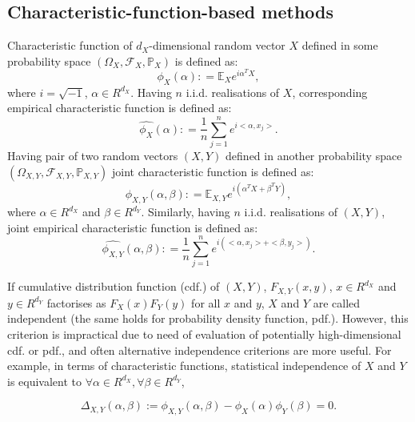 \documentclass{article}
\begin{document}
\subsection{Characteristic-function-based methods}
\label{section:previous_work_cf}
Characteristic function of $d_{X}$-dimensional random vector $X$ defined in some probability space $(\Omega_{X}, \mathcal{F}_{X}, \mathbb{P}_{X})$ is defined as: 
\begin{equation}
    \label{eq:characteristic_function}
    \phi_{X}(\alpha): = \mathbb{E}_{X} e^{i\alpha^{T}X}, 
\end{equation}
where $i=\sqrt{-1}$, $\alpha \in R^{d_{X}}$. Having $n$ i.i.d. realisations of $X$, corresponding empirical characteristic function is defined as:
\begin{equation}
    \label{eq:ecf}
  \widehat{\phi_{X}}(\alpha): = \frac{1}{n} \sum_{j=1}^{n} e^{i <\alpha, x_{j}>}.
\end{equation}
Having pair of two random vectors $(X,Y)$ defined in another probability space $(\Omega_{X,Y}, \mathcal{F}_{X,Y}, \mathbb{P}_{X,Y})$  joint characteristic function is defined as:
\begin{equation}
    \label{eq:joint_characteristic_function}
    \phi_{X,Y}(\alpha,\beta): = \mathbb{E}_{X,Y} e^{i(\alpha^{T}X + \beta^{T}Y)},
\end{equation}
where $\alpha \in R^{d_{X}}$ and $\beta \in R^{d_{Y}}$. Similarly, having 
$n$ i.i.d. realisations of $(X,Y)$, joint empirical characteristic function is defined as:
\begin{equation}
    \label{eq:joint_ecf}
\widehat{\phi_{X,Y}}(\alpha,\beta): = \frac{1}{n} \sum_{j=1}^{n} e^{i(<\alpha, x_{j}> + <\beta, y_{j}>) }.
\end{equation}

If cumulative distribution function (cdf.) of $(X,Y)$, $F_{X,Y}(x,y)$, $x \in R^{d_{X}}$ and $y \in R^{d_{Y}}$ factorises as $F_{X}(x)F_{Y}(y)$ for all $x$ and $y$, $X$ and $Y$ are called independent (the same holds for probability density function, pdf.). However, this criterion is impractical due to need of evaluation of potentially high-dimensional cdf. or pdf., and often alternative independence criterions are more useful. For example, in terms of characteristic functions, statistical independence  of $X$ and $Y$ is equivalent to $\forall \alpha \in R^{d_X},\forall \beta \in R^{d_Y} $, 

\begin{equation}
\label{eq:kac_theorem}
\Delta_{X,Y}(\alpha, \beta) := \phi_{X,Y}(\alpha,\beta) - \phi_{X}(\alpha) \phi_{Y}(\beta) = 0.
\end{equation}
\end{document}
